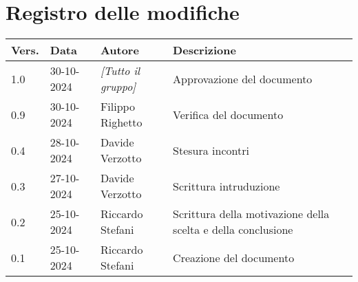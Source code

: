 \section*{Registro delle modifiche}

\begin{table}[h]
    \centering
    \begin{tabular}{|l|l|l|p{5cm}|}
        \hline
        \rowcolor[gray]{0.9}
        \textbf{Vers.} & \textbf{Data} & \textbf{Autore} & \textbf{Descrizione}\\
        \hline
        1.0 & 30-10-2024 & \emph{[Tutto il gruppo]} & Approvazione del documento\\
        \hline
        0.9 & 30-10-2024 & Filippo Righetto & Verifica del documento\\
        \hline
        0.4 & 28-10-2024 & Davide Verzotto & Stesura incontri\\
        \hline
        0.3 & 27-10-2024 & Davide Verzotto & Scrittura intruduzione\\
        \hline
        0.2 & 25-10-2024 & Riccardo Stefani & Scrittura della motivazione della scelta e della conclusione\\
        \hline
        0.1 & 25-10-2024 & Riccardo Stefani & Creazione del documento\\
        \hline
    \end{tabular}
\end{table}
